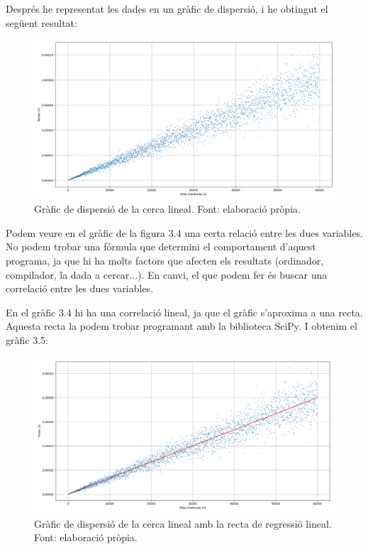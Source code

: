 Després he representat les dades en un gràfic de dispersió, i he obtingut el següent resultat:
\begin{figure}[H]
    \centering
    \includegraphics[width=1\textwidth]{capitols/figures/1.png}
    \caption[Gràfic de dispersió de la cerca lineal.]{Gràfic de dispersió de la cerca lineal. Font: elaboració pròpia.}
    \label{fig:my_label}
\end{figure}

Podem veure en el gràfic de la figura 3.4 una certa relació entre les dues variables. No podem trobar una fórmula que determini el comportament d'aquest programa, ja que hi ha molts factors que afecten els resultats (ordinador, compilador, la dada a cercar...). En canvi, el que podem fer és buscar una correlació entre les dues variables.

En el gràfic 3.4 hi ha una correlació lineal, ja que el gràfic s'aproxima a una recta. Aquesta recta la podem trobar programant amb la biblioteca SciPy. I obtenim el gràfic 3.5:
\begin{figure}[H]
    \centering
    \includegraphics[width=1\textwidth]{capitols/figures/2.png}
    \caption[Gràfic de dispersió de la cerca lineal amb la recta de regressió lineal.]{Gràfic de dispersió de la cerca lineal amb la recta de regressió lineal. Font: elaboració pròpia.}
    \label{fig:my_label}
\end{figure}

